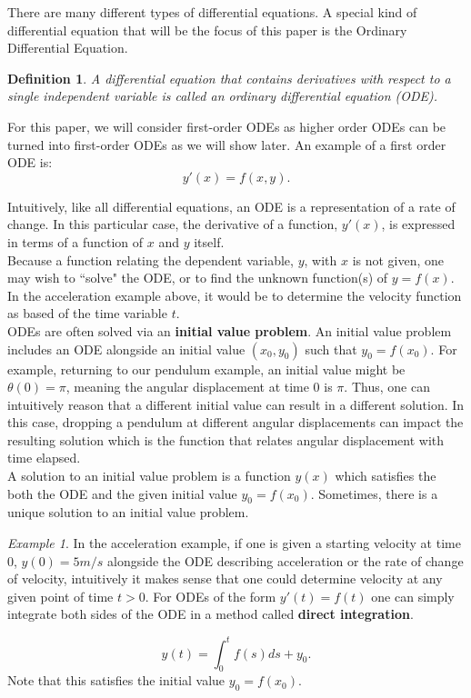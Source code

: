\documentclass{article}
\newtheorem{definition}{Definition}
\theoremstyle{remark}
\newtheorem{example}{Example}
\begin{document}
There are many different types of differential equations. A special kind of differential equation that will be the focus of this paper is the Ordinary Differential Equation.

\begin{definition}
    A differential equation that contains derivatives with respect to a single independent variable is called an ordinary differential equation (ODE).
\end{definition}

For this paper, we  will consider first-order ODEs as higher order ODEs can be turned into first-order ODEs as we will show later. An example of a first order ODE is:
$$y'(x) = f(x,y).$$

Intuitively, like all differential equations, an ODE is a representation of a rate of change. In this particular case, the derivative of a function, $y'(x)$, is expressed in terms of a function of $x$ and $y$ itself. \\

Because a function relating the dependent variable, $y$, with $x$ is not given, one may wish to ``solve" the ODE, or to find the unknown function(s) of $y=f(x)$. In the acceleration example above, it would be to determine the velocity function as based of the time variable $t$. \\

ODEs are often solved via an \textbf{initial value problem}. An initial value problem includes an ODE alongside an initial value $(x_0, y_0)$ such that $y_0 = f(x_0)$. For example, returning to our pendulum example, an initial value might be $\theta(0) = \pi$, meaning the angular displacement at time 0 is $\pi$. Thus, one can intuitively reason that a different initial value can result in a different solution. In this case, dropping a pendulum at different angular displacements can impact the resulting solution which is the function that relates angular displacement with time elapsed. \\


A solution to an initial value problem is a function $y(x)$ which satisfies the both the ODE and the given initial value $y_0 = f(x_0)$. Sometimes, there is a unique solution to an initial value problem.\\

\begin{example}

 In the acceleration example, if one is given a starting velocity at time 0, $y(0) = 5m/s$ alongside the ODE describing acceleration or the rate of change of velocity, intuitively it makes sense that one could determine velocity at any given point of time $t>0$. For ODEs of the form $y'(t) = f(t)$ one can simply integrate both sides of the ODE in a method called \textbf{direct integration}. 

$$y(t) = \int_0^tf(s)ds + y_0.$$
Note that this satisfies the initial value $y_0 = f(x_0)$. 

\end{example}
\end{document}

